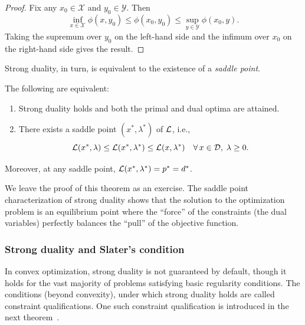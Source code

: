 \begin{proof}
  Fix any $x_0 \in {\mathcal X}$ and $y_0 \in {\mathcal Y}$. Then
  $$
    \inf_{x \in {\mathcal X}} \phi(x, y_0) \leq \phi(x_0, y_0) \leq \sup_{y \in {\mathcal Y}} \phi(x_0, y).
  $$
  Taking the supremum over $y_0$ on the left-hand side and the infimum over $x_0$
  on the right-hand side gives the result.
\end{proof}

Strong duality, in turn, is equivalent to the existence of a \emph{saddle point}.

\begin{theorem}\label{th:saddleploint}
  The following are equivalent:
  \begin{enumerate}
    \item Strong duality holds and both the primal and dual optima are attained.
    \item There exists a saddle point $(x^*, \lambda^*)$ of $\mathcal{L}$, i.e.,
    $$
      \mathcal{L}(x^*, \lambda) \leq \mathcal{L}(x^*, \lambda^*) \leq \mathcal{L}(x, \lambda^*)
      \quad \forall\, x \in {\mathcal D},\; \lambda \geq 0.
    $$
  \end{enumerate}
  Moreover, at any saddle point, $\mathcal{L}(x^*, \lambda^*) = p^* = d^*$.
\end{theorem}

We leave the proof of this theorem as an exercise. The saddle point characterization of strong duality shows that the solution to the optimization problem is an equilibrium point where the ``force'' of the constraints (the dual variables) perfectly balances the ``pull'' of the objective function.






\subsubsection{Strong duality and Slater's condition}

In convex optimization, strong duality is not guaranteed by default, though it holds for the vast majority of problems satisfying basic regularity conditions. The conditions (beyond convexity), under
which strong duality holds are called constraint qualifications. One such constraint qualification is  introduced in the next
theorem~\cite{rockafellar2015convex,LVanderberghe_SBoyd_book}.


